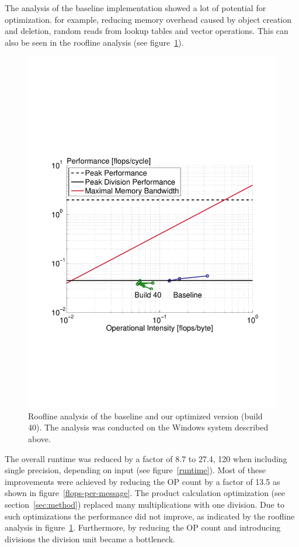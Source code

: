 The analysis of the baseline implementation showed a lot of potential for optimization. for example, reducing memory overhead caused by object creation and deletion, random reads from lookup tables and vector operations. This can also be seen in the roofline analysis \cite{Ofenbeck:14} (see figure~\ref{roofline-mixed}).
\begin{figure}\centering
    \includegraphics[scale=0.48, trim={2cm 6.5cm 1cm 8.5cm},clip]{graphics/roofline_mixed.pdf}
  \caption{Roofline analysis of the baseline and our optimized version (build 40). The analysis was conducted on the Windows system described above.\label{roofline-mixed}}
\end{figure}

The overall runtime was reduced by a factor of 8.7 to 27.4, 120 when including single precision, depending on input (see figure~\ref{runtime}). Most of these improvements were achieved by reducing the OP count by a factor of 13.5 as shown in figure~\ref{flops-per-message}. The product calculation optimization (see section~\ref{sec:method}) replaced many multiplications with one division. Due to such optimizations the performance did not improve, as indicated by the roofline analysis in figure~\ref{roofline-mixed}. Furthermore, by reducing the OP count and introducing divisions the division unit became a bottleneck.

